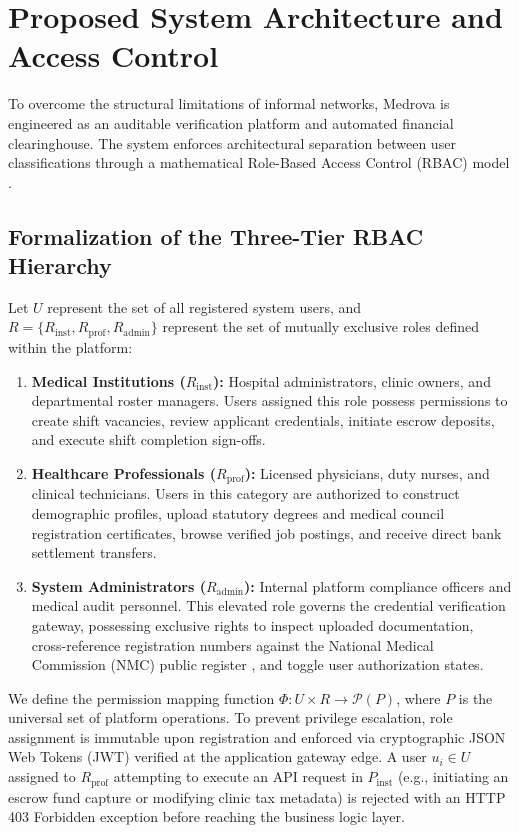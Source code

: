 \documentclass[conference]{IEEEtran}
\begin{document}
\section{Proposed System Architecture and Access Control}
To overcome the structural limitations of informal networks, Medrova is engineered as an auditable verification platform and automated financial clearinghouse. The system enforces architectural separation between user classifications through a mathematical Role-Based Access Control (RBAC) model \cite{sandhu1996role}.

\subsection{Formalization of the Three-Tier RBAC Hierarchy}
Let $U$ represent the set of all registered system users, and $R = \{R_{\text{inst}}, R_{\text{prof}}, R_{\text{admin}}\}$ represent the set of mutually exclusive roles defined within the platform:
\begin{enumerate}
    \item \textbf{Medical Institutions ($R_{\text{inst}}$):} Hospital administrators, clinic owners, and departmental roster managers. Users assigned this role possess permissions to create shift vacancies, review applicant credentials, initiate escrow deposits, and execute shift completion sign-offs.
    \item \textbf{Healthcare Professionals ($R_{\text{prof}}$):} Licensed physicians, duty nurses, and clinical technicians. Users in this category are authorized to construct demographic profiles, upload statutory degrees and medical council registration certificates, browse verified job postings, and receive direct bank settlement transfers.
    \item \textbf{System Administrators ($R_{\text{admin}}$):} Internal platform compliance officers and medical audit personnel. This elevated role governs the credential verification gateway, possessing exclusive rights to inspect uploaded documentation, cross-reference registration numbers against the National Medical Commission (NMC) public register \cite{nmc2023register}, and toggle user authorization states.
\end{enumerate}

We define the permission mapping function $\Phi: U \times R \rightarrow \mathcal{P}(P)$, where $P$ is the universal set of platform operations. To prevent privilege escalation, role assignment is immutable upon registration and enforced via cryptographic JSON Web Tokens (JWT) verified at the application gateway edge. A user $u_i \in U$ assigned to $R_{\text{prof}}$ attempting to execute an API request in $P_{\text{inst}}$ (e.g., initiating an escrow fund capture or modifying clinic tax metadata) is rejected with an HTTP 403 Forbidden exception before reaching the business logic layer.
\end{document}
